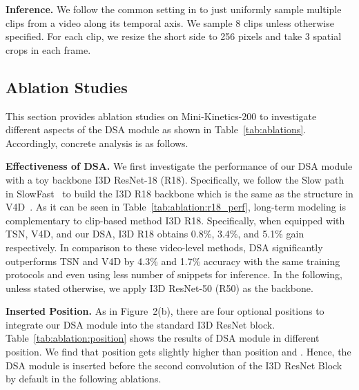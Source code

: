 \documentclass[sigconf]{acmart}
\newcommand{\RNum}[1]{\uppercase\expandafter{\romannumeral #1\relax}}
\begin{document}
{{\textbf{Inference.} 
We follow the common setting in \cite{slowfast} to just uniformly sample multiple clips from a video along its temporal axis. We sample 8 clips unless otherwise specified. For each clip, we resize the short side to 256 pixels and take 3 spatial crops in each frame.


\subsection{Ablation Studies}
\label{sec:ab}
This section provides ablation studies on Mini-Kinetics-200 to investigate different aspects of the DSA module as shown in Table~\ref{tab:ablations}. Accordingly, concrete analysis is as follows.

\textbf{Effectiveness of DSA.} 
 We first investigate the performance of our DSA module with a toy backbone I3D ResNet-18 (R18). Specifically, we follow the Slow path in SlowFast~\cite{slowfast} to build the I3D R18 backbone which is the same as the structure in V4D~\cite{zhang2020v4d}. As it can be seen in Table~\ref{tab:ablation:r18_perf}, long-term modeling is complementary to clip-based method I3D R18. Specifically, when equipped with TSN, V4D, and our DSA, I3D R18 obtains 0.8\%, 3.4\%, and 5.1\% gain respectively. In comparison to these video-level methods, DSA significantly outperforms TSN and V4D by 4.3\% and 1.7\% accuracy with the same training protocols and even using less number of snippets for inference. In the following, unless stated otherwise, we apply I3D ResNet-50 (R50) as the backbone. 


\textbf{Inserted Position.}
As in Figure~2(b), there are four optional positions to integrate our DSA module into the standard I3D ResNet block. Table~\ref{tab:ablation:position} shows the results of DSA module in different position. We find that position \RNum{2} gets slightly higher than position \RNum{1} and \RNum{4}. Hence, the DSA module is inserted before the second convolution of the I3D ResNet Block by default in the following ablations.

}}
\end{document}
